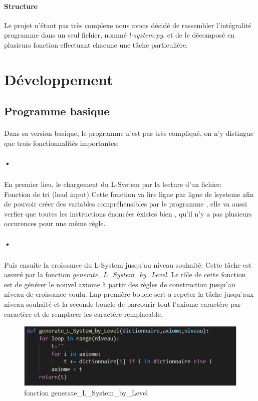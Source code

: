 \documentclass{report}
\begin{document}
		\paragraph{Structure}
			Le projet n’étant pas très complexe nous avons décidé de rassembler l’intégralité programme dans un seul fichier, nommé \emph{l-system.py}, et de le décomposé en plusieurs fonction effectuant chacune une tâche particulière.
	\section{Développement}
		\subsection{Programme basique}
			\paragraph{} Dans sa version basique, le programme n'est pas très compliqué, on n'y distingue que trois fonctionnalités importantes:
				\subparagraph{•}
				En premier lieu, le chargement du L-System par la lecture d'un fichier: \\
				Fonction de tri (load input)
				Cette fonction va lire ligne par ligne de lsysteme afin de pouvoir créer des variables compréhensibles par le programme , elle va aussi verfier que toutes les instructions énoncées éxistes bien , qu'il n'y a pas plusieurs occurences pour une même règle.
				
				\subparagraph{•}
				Puis ensuite la croissance du L-System jusqu'au niveau souhaité:
				Cette tâche est assuré par la fonction \emph{generate\_L\_System\_by\_Level}. Le rôle de cette fonction est de générer le nouvel axiome à partir des règles de construction jusqu'au niveau de croissance voulu.
				Lap première boucle sert a repeter la tâche jusqu'aux niveau souhaité et la seconde boucle de parcourir tout l'axiome caractère par caractère et de remplacer les caractère remplacable. 

				\begin{figure}[h]
					\begin{center}
						\includegraphics[scale=0.70]{images/generatebylevel.PNG}
						\caption{fonction generate\_L\_System\_by\_Level}
					\end{center}
				\end{figure}
				
\end{document}
